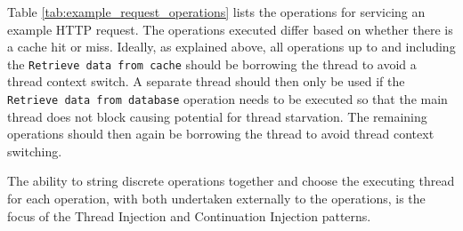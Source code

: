 \documentclass[prodmode]{style/acmlarge}
\begin{document}
Table \ref{tab:example_request_operations} lists the operations for servicing an
example HTTP request.  The operations executed differ based on whether there is
a cache hit or miss.  Ideally, as explained above, all operations up to and
including the \texttt{Retrieve data from cache} should be borrowing the thread
to avoid a thread context switch.  A separate thread should then only be used if
the \texttt{Retrieve data from database} operation needs to be executed so that
the main thread does not block causing potential for thread starvation.  The
remaining operations should then again be borrowing the thread to avoid thread
context switching.

\begin{table}[t]
\label{tab:example_request_operations}
\end{table}

The ability to string discrete operations together and choose the executing
thread for each operation, with both undertaken externally to the operations, is
the focus of the Thread Injection and Continuation Injection patterns.
\end{document}
